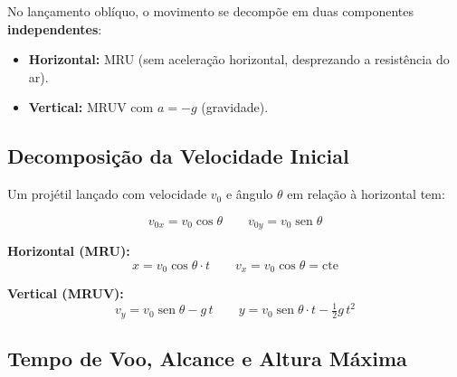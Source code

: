 \documentclass[12pt,a4paper]{article}
\begin{document}
\begin{tcolorbox}[defbox={Princ\'ipio da Independ\^encia dos Movimentos}]
  No lan\c{c}amento obl\'iquo, o movimento se decompõe em duas componentes
  \textbf{independentes}:
  \begin{itemize}[nosep]
    \item \textbf{Horizontal:} MRU (sem aceleração horizontal,
          desprezando a resist\^encia do ar).
    \item \textbf{Vertical:} MRUV com $a = -g$ (gravidade).
  \end{itemize}
\end{tcolorbox}

\subsection{Decomposi\c{c}\~ao da Velocidade Inicial}

Um proj\'etil lan\c{c}ado com velocidade $v_0$ e \^angulo $\theta$ em rela\c{c}\~ao \`a
horizontal tem:

\[
  v_{0x} = v_0 \cos\theta \qquad v_{0y} = v_0 \operatorname{sen}\theta
\]

\begin{center}
\end{center}

\begin{tcolorbox}[formulabox={Equa\c{c}\~oes do Lan\c{c}amento Obl\'iquo}]
  \textbf{Horizontal (MRU):}
  \[
    x = v_0\cos\theta\cdot t \qquad v_x = v_0\cos\theta = \text{cte}
  \]

  \textbf{Vertical (MRUV):}
  \[
    v_y = v_0\operatorname{sen}\theta - g\,t \qquad
    y = v_0\operatorname{sen}\theta\cdot t - \tfrac{1}{2}g\,t^2
  \]
\end{tcolorbox}

\subsection{Tempo de Voo, Alcance e Altura M\'axima}
\end{document}
